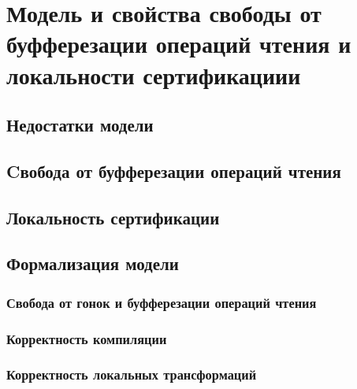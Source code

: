 \chapter{Модель \WkmS и свойства свободы от буфферезации операций чтения и локальности сертификациии}
\label{ch:weakestmo2}

\section{Недостатки модели \Wkm}

\section{Cвобода от буфферезации операций чтения}

\section{Локальность сертификации}

\section{Формализация модели \WkmS}

\subsection{Свобода от гонок и буфферезации операций чтения}

\subsection{Корректность компиляции}

\subsection{Корректность локальных трансформаций}
